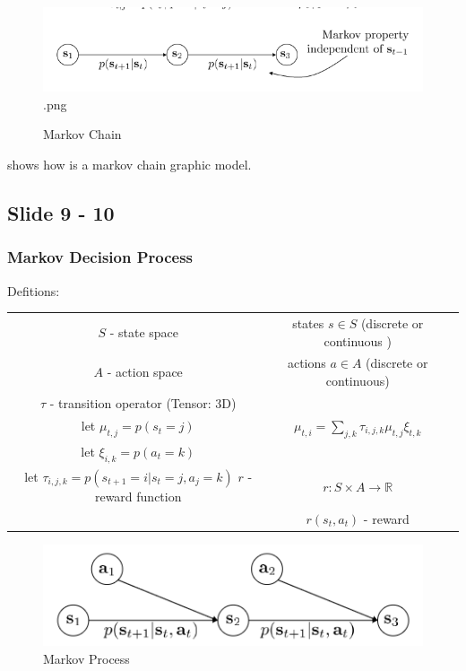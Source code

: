 \documentclass[]{article}
\begin{document}
\begin{figure}
\begin{center}
    \includegraphics[scale=0.5]{cap3img/markovchain.png}.png
\end{center}
\caption{Markov Chain}
\label{fig:markovchain}
\end{figure}

 shows how is a markov chain graphic model. 



\subsection*{Slide 9 - 10}
\label{sub:Slide 9}

\subsubsection*{Markov Decision Process}
\label{sub:Markov Decision Process}


Defitions:
\par 
\begin{tabular}{ccc}
    $\mathit{S}$ - state space & states $s \in S$ (discrete or continuous ) & \\
    $\mathit{A}$ - action space & actions $a \in A$ (discrete or continuous) & \\
    $\tau$ - transition operator (Tensor: 3D) & & \\
    let $\mu_{t,j} = p(s_{t} = j)$ & $\mu_{t,i}= \sum_{j,k}\tau_{i,j,k}\mu_{t,j}\xi_{t,k}$ & \\
    let $\xi_{i,k} = p(a_{t} = k)$ & & \\
    let $\tau_{i,j,k} = p(s_{t + 1} = i | s_{t} = j, a_{j} = k)$
    $\mathit{r}$ - reward function  & $r : \mathit{S} \times \mathit{A} \rightarrow \mathbb{R}$ & \\
                                    & $r(s_{t},a_{t})$ - reward & \\
\end{tabular}

\begin{figure}
\begin{center}
    \includegraphics[scale=0.5]{cap3img/markovprocess.png}
\end{center}
\caption{Markov Process}
\label{fig:markovprocess}
\end{figure}
\end{document}
